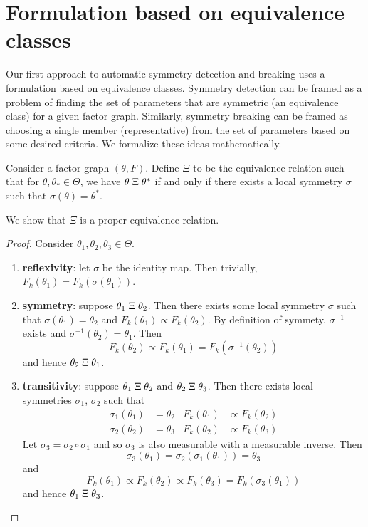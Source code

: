 

\section{Formulation based on equivalence classes}

Our first approach to automatic symmetry detection and breaking uses a formulation based on equivalence classes. Symmetry detection can be framed as a problem of finding the set of parameters that are symmetric (an equivalence class) for a given factor graph. Similarly, symmetry breaking can be framed as choosing a single member (representative) from the set of parameters based on some desired criteria. We formalize these ideas mathematically.

\begin{defn}
Consider a factor graph $(\theta,F)$. Define $\Xi$ to be the equivalence relation such that for $\theta,\theta_*\in\Theta$, we have $\theta\;\Xi\;\theta^*$ if and only if there exists a local symmetry $\sigma$ such that $\sigma(\theta)=\theta^*$.
\end{defn}

\noindent We show that $\Xi$ is a proper equivalence relation.

\begin{proof}
Consider $\theta_1, \theta_2, \theta_3\in\Theta$.
\begin{enumerate}

\item
\textbf{reflexivity}: let $\sigma$ be the identity map. Then trivially, $F_k(\theta_1) = F_k(\sigma(\theta_1))$.

\item
\textbf{symmetry}: suppose $\theta_1\;\Xi\;\theta_2$. Then there exists some local symmetry $\sigma$ such that $\sigma(\theta_1)=\theta_2$ and $F_k(\theta_1) \propto F_k(\theta_2)$. By definition of symmety, $\sigma^{-1}$ exists and $\sigma^{-1}(\theta_2)=\theta_1$. Then
\[
F_k(\theta_2) \propto F_k(\theta_1) = F_k(\sigma^{-1}(\theta_2))
\]
and hence $\theta_2\;\Xi\;\theta_1$.

\item
\textbf{transitivity}: suppose $\theta_1\;\Xi\;\theta_2$ and $\theta_2\;\Xi\;\theta_3$. Then there exists local symmetries $\sigma_1$, $\sigma_2$ such that
\begin{align*}
\sigma_1(\theta_1)&=\theta_2 & F_k(\theta_1)&\propto F_k(\theta_2) \\
\sigma_2(\theta_2)&=\theta_3 & F_k(\theta_2)&\propto F_k(\theta_3)
\end{align*}
Let $\sigma_3=\sigma_2\circ\sigma_1$ and so $\sigma_3$ is also measurable with a measurable inverse. Then
\[
\sigma_3(\theta_1)=\sigma_2(\sigma_1(\theta_1)) = \theta_3
\]
and
\[
F_k(\theta_1) \propto F_k(\theta_2) \propto F_k(\theta_3) = F_k(\sigma_3(\theta_1))
\]
and hence $\theta_1\;\Xi\;\theta_3$.

\end{enumerate}
\end{proof}

